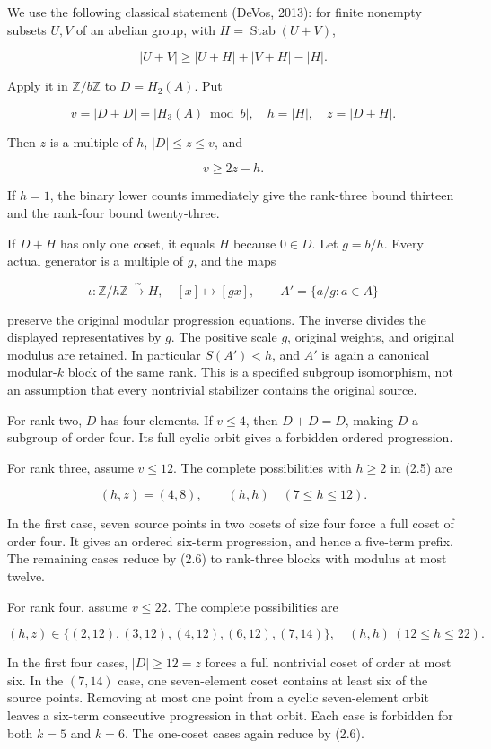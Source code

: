\documentclass[11pt,a4paper]{article}
\begin{document}
We use the following classical statement (DeVos, 2013): for finite nonempty subsets \(U,V\) of an abelian group, with \(H=\operatorname{Stab}(U+V)\),

\[
|U+V|\ge|U+H|+|V+H|-|H|.
\tag{2.4}
\]

Apply it in \(\mathbb Z/b\mathbb Z\) to \(D=H_2(A)\). Put

\[
v=|D+D|=|H_3(A)\bmod b|,\quad h=|H|,\quad z=|D+H|.
\]

Then \(z\) is a multiple of \(h\), \(|D|\le z\le v\), and

\[
v\ge2z-h.
\tag{2.5}
\]

If \(h=1\), the binary lower counts immediately give the rank-three bound thirteen and the rank-four bound twenty-three.

If \(D+H\) has only one coset, it equals \(H\) because \(0\in D\). Let \(g=b/h\). Every actual generator is a multiple of \(g\), and the maps

\[
\iota:\mathbb Z/h\mathbb Z\overset\sim\longrightarrow H,
\quad[x]\longmapsto[gx],\qquad
A'=\{a/g:a\in A\}
\tag{2.6}
\]

preserve the original modular progression equations. The inverse divides the displayed representatives by \(g\). The positive scale \(g\), original weights, and original modulus are retained. In particular \(S(A')<h\), and \(A'\) is again a canonical modular-\(k\) block of the same rank. This is a specified subgroup isomorphism, not an assumption that every nontrivial stabilizer contains the original source.

For rank two, \(D\) has four elements. If \(v\le4\), then \(D+D=D\), making \(D\) a subgroup of order four. Its full cyclic orbit gives a forbidden ordered progression.

For rank three, assume \(v\le12\). The complete possibilities with \(h\ge2\) in (2.5) are

\[
(h,z)=(4,8),\qquad (h,h)\quad(7\le h\le12).
\tag{2.7}
\]

In the first case, seven source points in two cosets of size four force a full coset of order four. It gives an ordered six-term progression, and hence a five-term prefix. The remaining cases reduce by (2.6) to rank-three blocks with modulus at most twelve.

For rank four, assume \(v\le22\). The complete possibilities are

\[
(h,z)\in\{(2,12),(3,12),(4,12),(6,12),(7,14)\},
\quad (h,h)\ (12\le h\le22).
\tag{2.8}
\]

In the first four cases, \(|D|\ge12=z\) forces a full nontrivial coset of order at most six. In the \((7,14)\) case, one seven-element coset contains at least six of the source points. Removing at most one point from a cyclic seven-element orbit leaves a six-term consecutive progression in that orbit. Each case is forbidden for both \(k=5\) and \(k=6\). The one-coset cases again reduce by (2.6).
\end{document}
